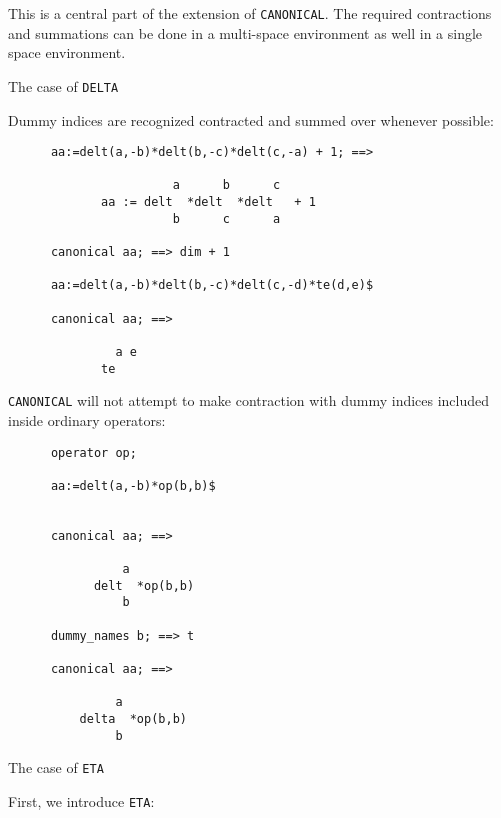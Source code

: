 This is a central part of the extension of \texttt{CANONICAL}.
The required contractions and summations can be done in a
multi-space environment as well in a single space environment.
\begin{center}
The case of \texttt{DELTA}
\end{center}
Dummy indices are recognized  contracted and summed over whenever possible:
\begin{verbatim}
      aa:=delt(a,-b)*delt(b,-c)*delt(c,-a) + 1; ==>

                       a      b      c
             aa := delt  *delt  *delt   + 1
                       b      c      a

      canonical aa; ==> dim + 1

      aa:=delt(a,-b)*delt(b,-c)*delt(c,-d)*te(d,e)$

      canonical aa; ==>

               a e
             te
\end{verbatim}
\texttt{CANONICAL} will not attempt to make contraction with
dummy indices included inside ordinary operators:
\begin{verbatim}
      operator op;

      aa:=delt(a,-b)*op(b,b)$


      canonical aa; ==>

                a
            delt  *op(b,b)
                b

      dummy_names b; ==> t

      canonical aa; ==>

               a
          delta  *op(b,b)
               b
\end{verbatim}
\begin{center}
The case of \texttt{ETA}
\end{center}
First, we introduce  \texttt{ETA}:
